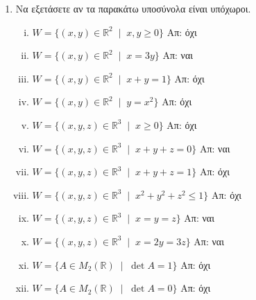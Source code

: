 


\usepackage{anyfontsize}
\pagestyle{vangelis}



\begin{center}
\end{center}

\vspace{\baselineskip}

\begin{enumerate}
  \item Να εξετάσετε αν τα παρακάτω υποσύνολα είναι υπόχωροι. 
    \begin{enumerate}[(i)]
      \item $ W = \{(x,y)\in \mathbb{R}^{2} \; \mid \; x,y \geq 0 \} $ 
        \hfill Απ: όχι 
      \item $ W = \{ (x,y) \in \mathbb{R}^{2} \; \mid \; x = 3y \} $ \hfill Απ: ναι
      \item $ W = \{ (x,y) \in \mathbb{R}^{2} \; \mid \; x+y=1 \} $ 
        \hfill Απ: όχι 
      \item $ W = \{ (x,y) \in \mathbb{R}^{2} \; \mid \; y = x^{2} \} $ 
        \hfill Απ: όχι 
      \item $ W = \{ (x,y,z) \in \mathbb{R}^{3} \; \mid \; x\geq 0 \} $ \hfill Απ:  όχι
      \item $ W = \{ (x,y,z) \in \mathbb{R}^{3} \; \mid \; x + y + z = 0 \} $ 
        \hfill Απ: ναι
      \item $ W = \{ (x,y,z) \in \mathbb{R}^{3} \; \mid \; x + y + z = 1 \} $ 
        \hfill Απ: όχι
      \item $ W = \{ (x,y,z) \in \mathbb{R}^{3} \; \mid \; x^{2} + y^{2} + z^{2} 
        \leq 1  \} $ \hfill Απ: όχι
      \item $ W = \{ (x,y,z) \in \mathbb{R}^{3} \; \mid \; x = y = z \} $ \hfill Απ: ναι
      \item $ W = \{ (x,y,z) \in \mathbb{R}^{3} \; \mid \; x = 2y = 3z \} $ 
        \hfill Απ: ναι 
      \item $ W = \{ A \in M_{2}(\mathbb{R}) \; \mid \; \det{A}=1 \} $ 
        \hfill Απ: όχι 
      \item $ W = \{ A \in M_{2}(\mathbb{R}) \; \mid \; \det{A}=0 \} $ 
        \hfill Απ: όχι 
    \end{enumerate}


\end{enumerate}
